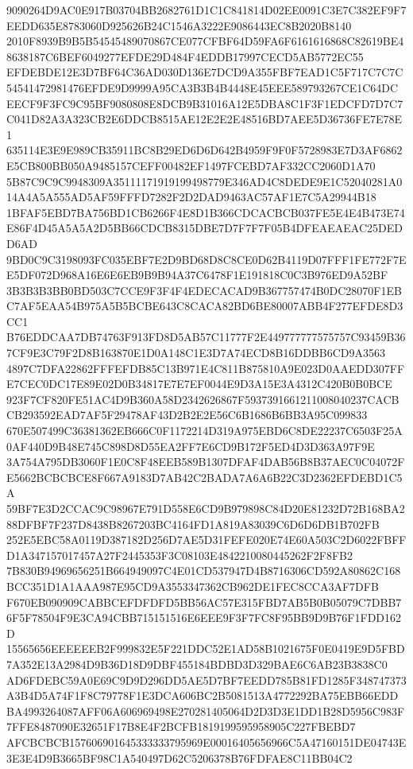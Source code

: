 \documentclass[UTF8,fontset=fandol,zihao=-4,a4paper]{ctexart}
\begin{document}
{{9090264D9AC0E917B03704BB2682761D1C1C841814D02EE0091C3E7C382EF9F7EEDD635E8783060D925626B24C1546A3222E9086443EC8B2020B8140
2010F8939B9B5B54545489070867CE077CFBF64D59FA6F6161616868C82619BE48638187C6BEF6049277EFDE29D484F4EDDB17997CECD5AB5772EC55
EFDEBDE12E3D7BF64C36AD030D136E7DCD9A355FBF7EAD1C5F717C7C7C54541472981476EFDE9D9999A95CA3B3B4B4448E45EEE589793267CE1C64DC
EECF9F3FC9C95BF9080808E8DCB9B31016A12E5DBA8C1F3F1EDCFD7D7C7C041D82A3A323CB2E6DDCB8515AE12E2E2E48516BD7AEE5D36736FE7E78E1
635114E3E9E989CB35911BC8B29ED6D6D642B4959F9F0F5728983E7D3AF6862E5CB800BB050A9485157CEFF00482EF1497FCEBD7AF332CC2060D1A70
5B87C9C9C9948309A35111171919199498779E346AD4C8DEDE9E1C52040281A014A4A5A555AD5AF59FFFD7282F2D2DAD9463AC57AF1E7C5A29944B18
1BFAF5EBD7BA756BD1CB6266F4E8D1B366CDCACBCB037FE5E4E4B473E74E86F4D45A5A5A2D5BB66CDCB8315DBE7D7F7F7F05B4DFEAEAEAC25DEDD6AD
9BD0C9C3198093FC035EBF7E2D9BD68D8C8CE0D62B4119D07FFF1FE772F7EE5DF072D968A16E6E6EB9B9B94A37C6478F1E191818C0C3B976ED9A52BF
3B3B3B3BB0BD503C7CCE9F3F4F4EDECACAD9B367757474B0DC28070F1EBC7AF5EAA54B975A5B5BCBE643C8CACA82BD6BE80007ABB4F277EFDE8D3CC1
B76EDDCAA7DB74763F913FD8D5AB57C11777F2E449777777575757C93459B367CF9E3C79F2D8B163870E1D0A148C1E3D7A74ECD8B16DDBB6CD9A3563
4897C7DFA22862FFFEFDB85C13B971E4C811B875810A9E023D0AAEDD307FFE7CEC0DC17E89E02D0B34817E7E7EF0044E9D3A15E3A4312C420B0B0BCE
923F7CF820FE51AC4D9B360A58D2342626867F5937391661211008040237CACBCB293592EAD7AF5F29478AF43D2B2E2E56C6B1686B6BB3A95C099833
670E507499C36381362EB666C0F1172214D319A975EBD6C8DE22237C6503F25A0AF440D9B48E745C898D8D55EA2FF7E6CD9B172F5ED4D3D363A97F9E
3A754A795DB3060F1E0C8F48EEB589B1307DFAF4DAB56B8B37AEC0C04072FE5662BCBCBCE8F667A9183D7AB42C2BADA7A6A6B22C3D2362EFDEBD1C5A
59BF7E3D2CCAC9C98967E791D558E6CD9B979898C84D20E81232D72B168BA288DFBF7F237D8438B8267203BC4164FD1A819A83039C6D6D6DB1B702FB
252E5EBC58A0119D387182D256D7AE5D31FEFE020E74E60A503C2D6022FBFFD1A347157017457A27F2445353F3C08103E4842210080445262F2F8FB2
7B830B94969656251B664949097C4E01CD537947D4B8716306CD592A80862C168BCC351D1A1AAA987E95CD9A3553347362CB962DE1FEC8CCA3AF7DFB
F670EB090909CABBCEFDFDFD5BB56AC57E315FBD7AB5B0B05079C7DBB76F5F78504F9E3CA94CBB715151516E6EEE9F3F7FC8F95BB9D9B76F1FDD162D
15565656EEEEEEB2F999832E5F221DDC52E1AD58B1021675F0E0419E9D5FBD7A352E13A2984D9B36D18D9DBF455184BDBD3D329BAE6C6AB23B3838C0
AD6FDEBC59A0E69C9D9D296DD5AE5D7BF7EEDD785B81FD1285F348747373A3B4D5A74F1F8C79778F1E3DCA606BC2B5081513A4772292BA75EBB66EDD
BA4993264087AFF06A606969498E270281405064D2D3D3E1DD1B28D5956C983F7FFE8487090E32651F17B8E4F2BCFB1819199595958905C227FBEBD7
AFCBCBCB157606901645333333795969E00016405656966C5A47160151DE04743E3E3E4D9B3665BF98C1A540497D62C5206378B76FDFAE8C11BB04C2
}}
\end{document}
